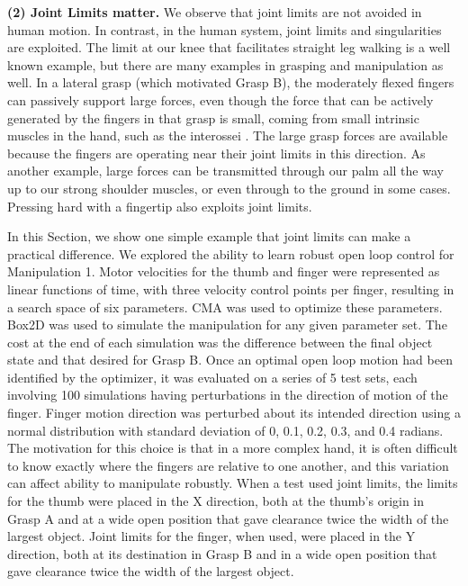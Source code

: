 \smallskip\noindent
{\bf (2) Joint Limits matter.}   We observe that joint limits are not avoided in human motion.   In contrast, in the human system, joint limits and singularities are exploited.    The limit at our knee that facilitates straight leg walking is a well known example, but there are many examples in grasping and manipulation as well.  In a lateral grasp (which motivated Grasp B), the moderately flexed fingers can passively support large forces, even though the force that can be actively generated by the fingers in that grasp is small, coming from small intrinsic muscles in the hand, such as the interossei \cite{brand1999clinical}.   The large grasp forces are available because the fingers are operating near their joint limits in this direction.   As another example, large forces can be transmitted through our palm all the way up to our strong shoulder muscles, or even through to the ground in some cases.   Pressing hard with a fingertip also exploits joint limits.

In this Section, we show one simple example that joint limits can make a practical difference.   We explored the ability to learn robust open loop control for Manipulation 1.    Motor velocities for the thumb and finger were represented as linear functions of time, with three velocity control points per finger, resulting in a search space of six parameters.   CMA was used to optimize these parameters.    Box2D \cite{catto2011box2d} was used to simulate the manipulation for any given parameter set.   The cost at the end of each simulation was the difference between the final object state and that desired for Grasp B.     Once an optimal open loop motion had been identified by the optimizer, it was evaluated on a series of 5 test sets, each involving 100 simulations having perturbations in the direction of motion of the finger.    Finger motion direction was perturbed about its intended direction using a normal distribution with standard deviation of 0, 0.1, 0.2, 0.3, and 0.4 radians.    The motivation for this choice is that in a more complex hand, it is often difficult to know exactly where the fingers are relative to one another, and this variation can affect ability to manipulate robustly.   When a test used joint limits, the limits for the thumb were placed in the X direction, both at the thumb's origin in Grasp A and at a wide open position that gave clearance twice the width of the largest object.   Joint limits for the finger, when used, were placed in the Y direction, both at its destination in Grasp B and in a wide open position that gave clearance twice the width of the largest object.

